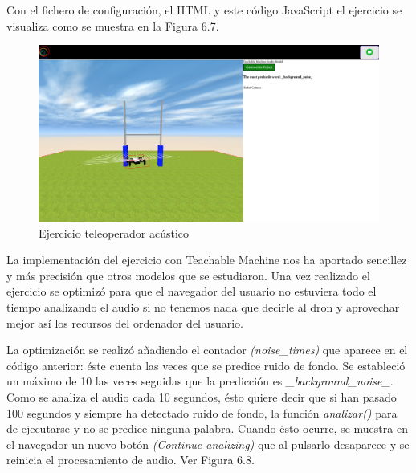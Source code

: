 Con el fichero de configuración, el HTML y este código JavaScript el ejercicio se visualiza como se muestra en la Figura 6.7.

\begin{figure}[H]
    \centering
    \includegraphics[width=1\textwidth, height=0.4\textwidth]{chapters/images/audio.png}
    \caption{Ejercicio teleoperador acústico}
    \label{fig:my_label}
\end{figure}

La implementación del ejercicio con Teachable Machine  nos ha aportado sencillez y más precisión que otros modelos que se estudiaron.
Una vez realizado el ejercicio se optimizó para que el navegador del usuario no estuviera todo el tiempo analizando el  audio si no tenemos nada que decirle al dron y aprovechar mejor así los recursos del ordenador del usuario.

La optimización se realizó añadiendo el contador \textit{(noise\_times)} que aparece en el código anterior: éste cuenta las veces que se predice ruido de fondo. Se estableció un máximo de 10 las veces seguidas que la predicción es \textit{\_background\_noise\_}. Como se analiza el audio cada 10 segundos, ésto quiere decir que si han pasado 100 segundos y siempre ha detectado ruido de fondo, la función \textit{analizar()} para de ejecutarse y no se predice ninguna palabra. Cuando ésto ocurre, se muestra en el navegador un nuevo botón \textit{(Continue analizing)} que al pulsarlo desaparece y se reinicia el procesamiento de audio. Ver Figura 6.8.

